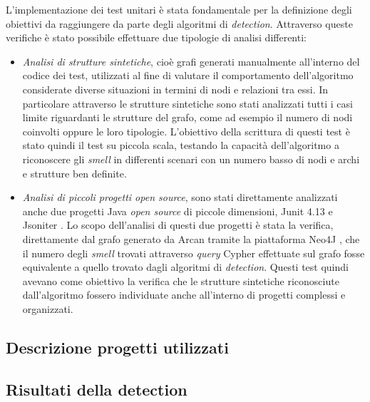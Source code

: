         L'implementazione dei test unitari è stata fondamentale per la definizione degli obiettivi da raggiungere da parte degli algoritmi di \textit{detection}. Attraverso queste verifiche è stato possibile effettuare due tipologie di analisi differenti:
        \begin{itemize}
            \item \textit{Analisi di strutture sintetiche}, cioè grafi generati manualmente all'interno del codice dei test, utilizzati al fine di valutare il comportamento dell'algoritmo considerate diverse situazioni in termini di nodi e relazioni tra essi. In particolare attraverso le strutture sintetiche sono stati analizzati tutti i casi limite riguardanti le strutture del grafo, come ad esempio il numero di nodi coinvolti oppure le loro tipologie. L'obiettivo della scrittura di questi test è stato quindi il test su piccola scala, testando la capacità dell'algoritmo a riconoscere gli \textit{smell} in differenti scenari con un numero basso di nodi e archi e strutture ben definite.
            
            \item \textit{Analisi di piccoli progetti open source}, sono stati direttamente analizzati anche due progetti Java \textit{open source} di piccole dimensioni, Junit 4.13 \cite{JunitWebsite} e Jsoniter \cite{JsoniterWebsite}. Lo scopo dell'analisi di questi due progetti è stata la verifica, direttamente dal grafo generato da Arcan tramite la piattaforma Neo4J \cite{Neo4JWebsite}, che il numero degli \textit{smell} trovati attraverso \textit{query} Cypher \cite{Cypher} effettuate sul grafo fosse equivalente a quello trovato dagli algoritmi di \textit{detection}. Questi test quindi avevano come obiettivo la verifica che le strutture sintetiche riconosciute dall'algoritmo fossero individuate anche all'interno di progetti complessi e organizzati.
        \end{itemize}


    \subsection{Descrizione progetti utilizzati}
        


    \subsection{Risultati della detection}
        
        
